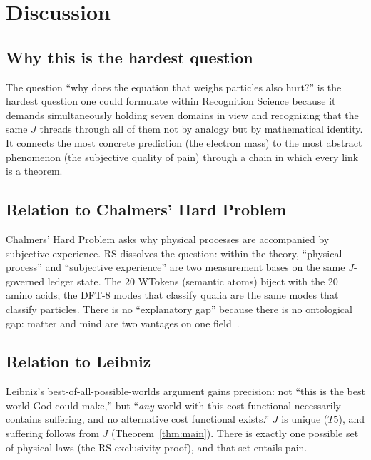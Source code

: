 \documentclass[11pt,a4paper]{article}
\theoremstyle{plain}
\theoremstyle{definition}
\theoremstyle{remark}
\newcommand{\Jcost}{J}
\begin{document}
\section{Discussion}
\label{sec:discussion}

\subsection{Why this is the hardest question}

The question ``why does the equation that weighs particles also hurt?''
is the hardest question one could formulate within Recognition Science
because it demands simultaneously holding seven domains in view and
recognizing that the same $\Jcost$ threads through all of them not
by analogy but by mathematical identity.  It connects the most
concrete prediction (the electron mass) to the most abstract
phenomenon (the subjective quality of pain) through a chain in which
every link is a theorem.

\subsection{Relation to Chalmers' Hard Problem}

Chalmers' Hard Problem asks why physical processes are accompanied
by subjective experience.  RS dissolves the question: within the
theory, ``physical process'' and ``subjective experience'' are
two measurement bases on the same $\Jcost$-governed ledger state.
The 20 WTokens (semantic atoms) biject with the 20 amino acids;
the DFT-8 modes that classify qualia are the same modes that
classify particles.  There is no ``explanatory gap'' because there
is no ontological gap: matter and mind are two vantages on one
field~\cite{WashburnAxioms2025}.

\subsection{Relation to Leibniz}

Leibniz's best-of-all-possible-worlds argument gains precision:
not ``this is the best world God could make,'' but ``\emph{any}
world with this cost functional necessarily contains suffering,
and no alternative cost functional exists.''  $\Jcost$ is unique
($T5$), and suffering follows from $\Jcost$ (Theorem~\ref{thm:main}).
There is exactly one possible set of physical laws (the RS
exclusivity proof), and that set entails pain.
\end{document}
